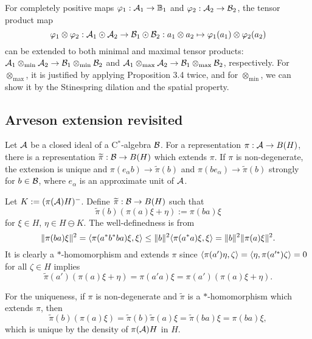 \documentclass{../../small}
\begin{document}
\begin{rmk*}
For completely positive maps $\varphi_1:\mathcal{A}_1\to\mathbb{B}_1$ and $\varphi_2:\mathcal{A}_2\to\mathcal{B}_2$, the tensor product map
\[\varphi_1\otimes\varphi_2:\mathcal{A}_1\odot\mathcal{A}_2\to\mathcal{B}_1\odot\mathcal{B}_2:a_1\otimes a_2\mapsto\varphi_1(a_1)\otimes\varphi_2(a_2)\]
can be extended to both minimal and maximal tensor products: $\mathcal{A}_1\otimes_{\min}\mathcal{A}_2\to\mathcal{B}_1\otimes_{\min}\mathcal{B}_2$ and $\mathcal{A}_1\otimes_{\max}\mathcal{A}_2\to\mathcal{B}_1\otimes_{\max}\mathcal{B}_2$, respectively.
For $\otimes_{\max}$, it is justified by applying Proposition 3.4 twice, and for $\otimes_{\min}$, we can show it by the Stinespring dilation and the spatial property.
\end{rmk*}


\subsection{Arveson extension revisited}

\begin{prop}
Let $\mathcal{A}$ be a closed ideal of a C$^*$-algebra $\mathcal{B}$.
For a representation $\pi:\mathcal{A}\to B(H)$, there is a representation $\widetilde\pi:\mathcal{B}\to B(H)$ which extends $\pi$.
If $\pi$ is non-degenerate, the extension is unique and $\pi(e_\alpha b)\to\tilde\pi(b)$ and $\pi(be_\alpha)\to\tilde\pi(b)$ strongly for $b\in\mathcal{B}$, where $e_\alpha$ is an approximate unit of $\mathcal{A}$.
\end{prop}
\begin{pf}
Let $K:=(\pi(\mathcal{A})H)^-$.
Define $\widetilde\pi:\mathcal{B}\to B(H)$ such that
\[\tilde\pi(b)(\pi(a)\xi+\eta):=\pi(ba)\xi\]
for $\xi\in H$, $\eta\in H\ominus K$.
The well-definedness is from
\[\|\pi(ba)\xi\|^2=\langle\pi(a^*b^*ba)\xi,\xi\rangle\le\|b\|^2\langle\pi(a^*a)\xi,\xi\rangle=\|b\|^2\|\pi(a)\xi\|^2.\]
It is clearly a $*$-homomorphism and extends $\pi$ since $\langle\pi(a')\eta,\zeta\rangle=\langle\eta,\pi(a'^*)\zeta\rangle=0$ for all $\zeta\in H$ implies
\[\tilde\pi(a')(\pi(a)\xi+\eta)=\pi(a'a)\xi=\pi(a')(\pi(a)\xi+\eta).\]

For the uniqueness, if $\pi$ is non-degenerate and $\tilde\pi$ is a $*$-homomorphism which extends $\pi$, then
\[\tilde\pi(b)(\pi(a)\xi)=\tilde\pi(b)\tilde\pi(a)\xi=\tilde\pi(ba)\xi=\pi(ba)\xi,\]
which is unique by the density of $\pi(\mathcal{A})H$ in $H$.
\end{pf}
\end{document}

